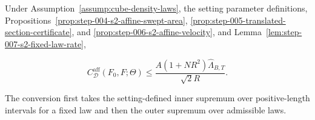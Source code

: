 \begin{lemma}
\label{lem:step-007-s2-capacity-conversion}
Under Assumption~\ref{assump:cube-density-laws}, the setting parameter definitions,
Propositions~\ref{prop:step-004-s2-affine-swept-area},
\ref{prop:step-005-translated-section-certificate}, and
\ref{prop:step-006-s2-affine-velocity}, and
Lemma~\ref{lem:step-007-s2-fixed-law-rate},

\begin{equation}
C^{\mathrm{aff}}_{\mathcal D}(F_0,F;\Theta)
\leq
\frac{A(1+NR^2)\widehat\Lambda_{B,T}}{\sqrt2R}.
\label{eq:step-007-capacity-bound}
\end{equation}

The conversion first takes the setting-defined inner supremum over positive-length intervals for a fixed law
and then the outer supremum over admissible laws.


\end{lemma}

